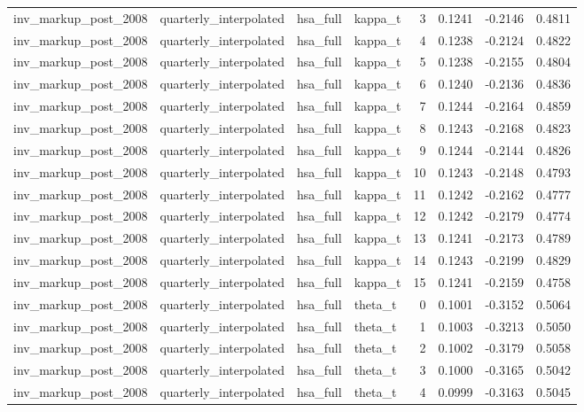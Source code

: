 \begin{tabular}{llllrrrr}
inv\_markup\_post\_2008 & quarterly\_interpolated & hsa\_full & kappa\_t & 3 & 0.1241 & -0.2146 & 0.4811 \\
inv\_markup\_post\_2008 & quarterly\_interpolated & hsa\_full & kappa\_t & 4 & 0.1238 & -0.2124 & 0.4822 \\
inv\_markup\_post\_2008 & quarterly\_interpolated & hsa\_full & kappa\_t & 5 & 0.1238 & -0.2155 & 0.4804 \\
inv\_markup\_post\_2008 & quarterly\_interpolated & hsa\_full & kappa\_t & 6 & 0.1240 & -0.2136 & 0.4836 \\
inv\_markup\_post\_2008 & quarterly\_interpolated & hsa\_full & kappa\_t & 7 & 0.1244 & -0.2164 & 0.4859 \\
inv\_markup\_post\_2008 & quarterly\_interpolated & hsa\_full & kappa\_t & 8 & 0.1243 & -0.2168 & 0.4823 \\
inv\_markup\_post\_2008 & quarterly\_interpolated & hsa\_full & kappa\_t & 9 & 0.1244 & -0.2144 & 0.4826 \\
inv\_markup\_post\_2008 & quarterly\_interpolated & hsa\_full & kappa\_t & 10 & 0.1243 & -0.2148 & 0.4793 \\
inv\_markup\_post\_2008 & quarterly\_interpolated & hsa\_full & kappa\_t & 11 & 0.1242 & -0.2162 & 0.4777 \\
inv\_markup\_post\_2008 & quarterly\_interpolated & hsa\_full & kappa\_t & 12 & 0.1242 & -0.2179 & 0.4774 \\
inv\_markup\_post\_2008 & quarterly\_interpolated & hsa\_full & kappa\_t & 13 & 0.1241 & -0.2173 & 0.4789 \\
inv\_markup\_post\_2008 & quarterly\_interpolated & hsa\_full & kappa\_t & 14 & 0.1243 & -0.2199 & 0.4829 \\
inv\_markup\_post\_2008 & quarterly\_interpolated & hsa\_full & kappa\_t & 15 & 0.1241 & -0.2159 & 0.4758 \\
inv\_markup\_post\_2008 & quarterly\_interpolated & hsa\_full & theta\_t & 0 & 0.1001 & -0.3152 & 0.5064 \\
inv\_markup\_post\_2008 & quarterly\_interpolated & hsa\_full & theta\_t & 1 & 0.1003 & -0.3213 & 0.5050 \\
inv\_markup\_post\_2008 & quarterly\_interpolated & hsa\_full & theta\_t & 2 & 0.1002 & -0.3179 & 0.5058 \\
inv\_markup\_post\_2008 & quarterly\_interpolated & hsa\_full & theta\_t & 3 & 0.1000 & -0.3165 & 0.5042 \\
inv\_markup\_post\_2008 & quarterly\_interpolated & hsa\_full & theta\_t & 4 & 0.0999 & -0.3163 & 0.5045 \\

\end{tabular}
